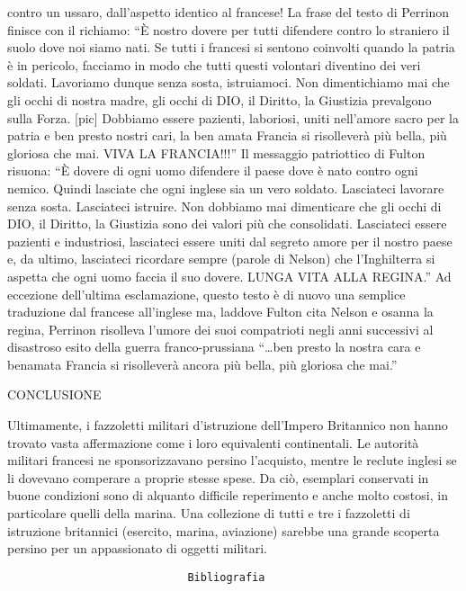 contro un ussaro, dall'aspetto identico al francese! La frase del testo
di Perrinon finisce con il richiamo: ``È nostro dovere per tutti
difendere contro lo straniero il suolo dove noi siamo nati. Se tutti i
francesi si sentono coinvolti quando la patria è in pericolo, facciamo
in modo che tutti questi volontari diventino dei veri soldati. Lavoriamo
dunque senza sosta, istruiamoci. Non dimentichiamo mai che gli occhi di
nostra madre, gli occhi di DIO, il Diritto, la Giustizia prevalgono
sulla Forza. {[}pic{]} Dobbiamo essere pazienti, laboriosi, uniti
nell'amore sacro per la patria e ben presto nostri cari, la ben amata
Francia si risolleverà più bella, più gloriosa che mai. VIVA LA
FRANCIA!!!'' Il messaggio patriottico di Fulton risuona: ``È dovere di
ogni uomo difendere il paese dove è nato contro ogni nemico. Quindi
lasciate che ogni inglese sia un vero soldato. Lasciateci lavorare senza
sosta. Lasciateci istruire. Non dobbiamo mai dimenticare che gli occhi
di DIO, il Diritto, la Giustizia sono dei valori più che consolidati.
Lasciateci essere pazienti e industriosi, lasciateci essere uniti dal
segreto amore per il nostro paese e, da ultimo, lasciateci ricordare
sempre (parole di Nelson) che l'Inghilterra si aspetta che ogni uomo
faccia il suo dovere. LUNGA VITA ALLA REGINA.'' Ad eccezione dell'ultima
esclamazione, questo testo è di nuovo una semplice traduzione dal
francese all'inglese ma, laddove Fulton cita Nelson e osanna la regina,
Perrinon risolleva l'umore dei suoi compatrioti negli anni successivi al
disastroso esito della guerra franco-prussiana ``\ldots{}ben presto la
nostra cara e benamata Francia si risolleverà ancora più bella, più
gloriosa che mai.''

CONCLUSIONE

Ultimamente, i fazzoletti militari d'istruzione dell'Impero Britannico
non hanno trovato vasta affermazione come i loro equivalenti
continentali. Le autorità militari francesi ne sponsorizzavano persino
l'acquisto, mentre le reclute inglesi se li dovevano comperare a proprie
stesse spese. Da ciò, esemplari conservati in buone condizioni sono di
alquanto difficile reperimento e anche molto costosi, in particolare
quelli della marina. Una collezione di tutti e tre i fazzoletti di
istruzione britannici (esercito, marina, aviazione) sarebbe una grande
scoperta persino per un appassionato di oggetti militari.

\begin{verbatim}
                            Bibliografia
\end{verbatim}


